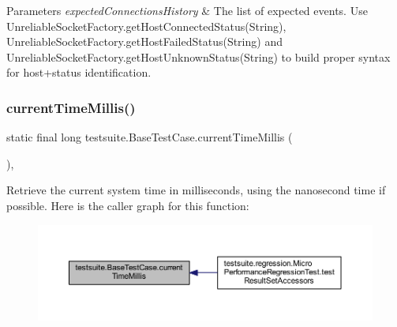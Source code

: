 \begin{DoxyParams}{Parameters}
{\em expected\+Connections\+History} & The list of expected events. Use Unreliable\+Socket\+Factory.\+get\+Host\+Connected\+Status(\+String), Unreliable\+Socket\+Factory.\+get\+Host\+Failed\+Status(\+String) and Unreliable\+Socket\+Factory.\+get\+Host\+Unknown\+Status(\+String) to build proper syntax for host+status identification. \\
\hline
\end{DoxyParams}
\mbox{\label{classtestsuite_1_1_base_test_case_a48d748cca7b09172b6e5e2fac15c6bc7}} 
\subsubsection{\texorpdfstring{current\+Time\+Millis()}{currentTimeMillis()}}
{\footnotesize\ttfamily static final long testsuite.\+Base\+Test\+Case.\+current\+Time\+Millis (\begin{DoxyParamCaption}{ }\end{DoxyParamCaption})\hspace{0.3cm}{\ttfamily [static]}, {\ttfamily [protected]}}

Retrieve the current system time in milliseconds, using the nanosecond time if possible. Here is the caller graph for this function\+:
\nopagebreak
\begin{figure}[H]
\begin{center}
\leavevmode
\includegraphics[width=350pt]{classtestsuite_1_1_base_test_case_a48d748cca7b09172b6e5e2fac15c6bc7_icgraph}
\end{center}
\end{figure}
\mbox{\label{classtestsuite_1_1_base_test_case_a694c26abcb73b73849f9d10ffdc4ebae}} 
